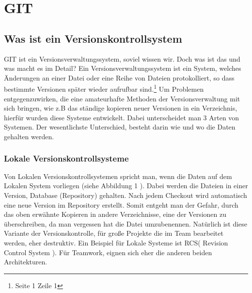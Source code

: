 \documentclass[12pt,a4paper,bibliography=totocnumbered,listof=totocnumbered]{scrartcl}
\begin{document}
\renewcommand{\sectionmark}[1]{\markright{#1}}
\renewcommand{\subsectionmark}[1]{}
\renewcommand{\subsubsectionmark}[1]{}
\rhead{\rightmark}

\onehalfspacing
\renewcommand{\thesection}{\arabic{section}}
\renewcommand{\theHsection}{\arabic{section}}
\setcounter{section}{0}
\setcounter{page}{1}

\section{GIT}

\subsection{Was ist ein Versionskontrollsystem}
GIT ist ein Versionsverwaltungssystem, soviel wissen wir. Doch was ist das und was macht es im Detail? Ein Versionsverwaltungssystem ist ein System, welches Änderungen an einer Datei oder eine Reihe von Dateien protokolliert, so dass  bestimmte Versionen später wieder aufrufbar sind.\footnote{\cite{chacon2009pro} Seite 1 Zeile 1 } Um Problemen entgegenzuwirken, die eine amateurhafte Methoden der Versionsverwaltung mit sich bringen, wie z.B das ständige kopieren neuer Versionen in ein Verzeichnis, hierfür wurden diese Systeme entwickelt. Dabei unterscheidet man 3 Arten von Systemen. Der wesentlichste Unterschied, besteht darin wie und wo die Daten gehalten werden.

\subsubsection{Lokale Versionskontrollsysteme}
Von Lokalen Versionskontrollsystemen spricht man, wenn die Daten auf dem Lokalen System vorliegen (siehe Abbildung 1 ). Dabei werden die Dateien in einer Version, Database (Repository) gehalten. Nach jedem Checkout wird automatisch eine neue Version im Repository erstellt. Somit entgeht man der Gefahr, durch das oben erwähnte Kopieren in andere Verzeichnisse, eine der Versionen zu überschreiben, da man vergessen hat die Datei umzubenennen. Natürlich ist diese Variante der Versionskontrolle, für große Projekte die im Team bearbeitet werden, eher destruktiv. Ein Beispiel für Lokale Systeme ist RCS( Revision Control System ). Für Teamwork, eignen sich eher die anderen beiden Architekturen. 
\end{document}
